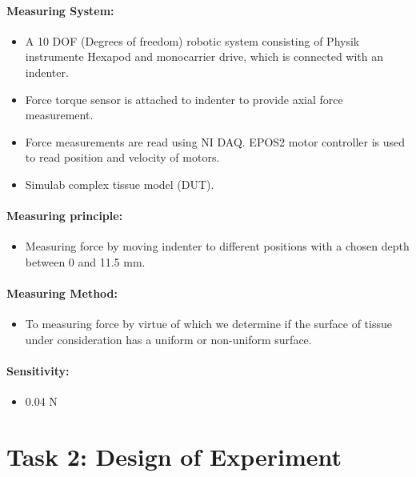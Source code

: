 \documentclass[10pt,a4paper]{article}
\begin{document}
		\paragraph{Measuring System:}
			\begin{itemize}
				\item A 10 DOF (Degrees of freedom) robotic system consisting of Physik instrumente Hexapod and monocarrier drive, which is connected with an indenter. 
				\item Force torque sensor is attached to indenter to provide axial force measurement.     
				\item Force measurements are read using NI DAQ. EPOS2 motor controller is used to read position and velocity of motors. 
				\item Simulab complex tissue model (DUT).
			\end{itemize}
		\paragraph{Measuring principle:}
			\begin{itemize}
				\item Measuring force by moving indenter to different positions with a chosen depth between 0 and 11.5 mm.
			\end{itemize}
		\paragraph{Measuring Method:}
			\begin{itemize}
			\item To measuring force by virtue of which we determine if the surface of tissue under consideration has a uniform or non-uniform surface.
			\end{itemize}
		\paragraph{Sensitivity:}
			\begin{itemize}
			\item 0.04 N 
			\end{itemize}
	\section{Task 2: Design of Experiment}
\end{document}
